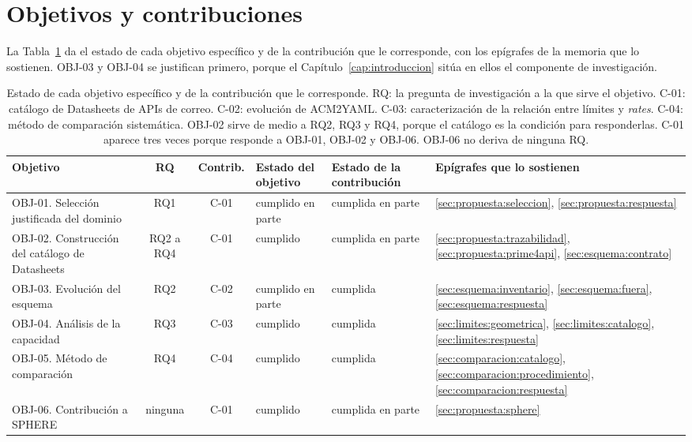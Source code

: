 \section{Objetivos y contribuciones}\label{sec:conclusiones:evaluacion}

La Tabla~\ref{tab:conclusiones:evaluacion} da el estado de cada objetivo específico y de la contribución que le corresponde, con los epígrafes de la memoria que lo sostienen.
OBJ-03 y OBJ-04 se justifican primero, porque el Capítulo~\ref{cap:introduccion} sitúa en ellos el componente de investigación.

\begin{table}[tbp]
\centering
\small
\setlength{\tabcolsep}{3pt}
\begin{tabular}{|>{\raggedright\arraybackslash}p{3.0cm}|c|c|>{\raggedright\arraybackslash}p{2.0cm}|>{\raggedright\arraybackslash}p{2.2cm}|>{\raggedright\arraybackslash}p{3.0cm}|}
\hline
\textbf{Objetivo} & \textbf{RQ} & \textbf{Contrib.} & \textbf{Estado del objetivo} & \textbf{Estado de la contribución} & \textbf{Epígrafes que lo sostienen} \\
\hline
OBJ-01. Selección justificada del dominio & RQ1 & C-01 & cumplido en parte & cumplida en parte & \ref{sec:propuesta:seleccion}, \ref{sec:propuesta:respuesta} \\
\hline
OBJ-02. Construcción del catálogo de Datasheets & RQ2 a RQ4 & C-01 & cumplido & cumplida en parte & \ref{sec:propuesta:trazabilidad}, \ref{sec:propuesta:prime4api}, \ref{sec:esquema:contrato} \\
\hline
OBJ-03. Evolución del esquema & RQ2 & C-02 & cumplido en parte & cumplida & \ref{sec:esquema:inventario}, \ref{sec:esquema:fuera}, \ref{sec:esquema:respuesta} \\
\hline
OBJ-04. Análisis de la capacidad & RQ3 & C-03 & cumplido & cumplida & \ref{sec:limites:geometrica}, \ref{sec:limites:catalogo}, \ref{sec:limites:respuesta} \\
\hline
OBJ-05. Método de comparación & RQ4 & C-04 & cumplido & cumplida & \ref{sec:comparacion:catalogo}, \ref{sec:comparacion:procedimiento}, \ref{sec:comparacion:respuesta} \\
\hline
OBJ-06. Contribución a SPHERE & ninguna & C-01 & cumplido & cumplida en parte & \ref{sec:propuesta:sphere} \\
\hline
\end{tabular}
\caption[Estado de cada objetivo específico y de la contribución que le corresponde]{Estado de cada objetivo específico y de la contribución que le corresponde. RQ: la pregunta de investigación a la que sirve el objetivo. C-01: catálogo de Datasheets de APIs de correo. C-02: evolución de ACM2YAML. C-03: caracterización de la relación entre límites y \textit{rates}. C-04: método de comparación sistemática. OBJ-02 sirve de medio a RQ2, RQ3 y RQ4, porque el catálogo es la condición para responderlas. C-01 aparece tres veces porque responde a OBJ-01, OBJ-02 y OBJ-06. OBJ-06 no deriva de ninguna RQ.}
\label{tab:conclusiones:evaluacion}
\end{table}

